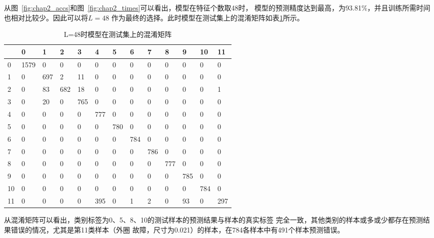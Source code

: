 从图~\ref{fig:chap2_accs}和图~\ref{fig:chap2_times}可以看出，模型在特征个数取48时，
模型的预测精度达到最高，为93.81\%，并且训练所需时间也相对比较少。因此可以将$L=48$
作为最终的选择。此时模型在测试集上的混淆矩阵如表\ref{tab:chap2:confusion_matrix}所示。
\begin{table}[htb]
  \centering
  \begin{minipage}[t]{0.9\linewidth} %
  \caption{L=48时模型在测试集上的混淆矩阵}
  \label{tab:chap2:confusion_matrix}
    \begin{tabularx}{\linewidth}{l|XXXXXXXXXXXX}
      \toprule[1.5pt]
         &    0 &   1 &   2 &   3 &   4 &   5 &   6 &   7 &   8 &   9 &  10 &  11 \\\midrule[1pt]
      0  & 1579 &   0 &   0 &   0 &   0 &   0 &   0 &   0 &   0 &   0 &   0 &   0 \\
      1  &    0 & 697 &   2 &  11 &   0 &   0 &   0 &   0 &   0 &   0 &   0 &   0 \\
      2  &    0 &  83 & 682 &  18 &   0 &   0 &   0 &   0 &   0 &   0 &   0 &   1 \\
      3  &    0 &  20 &   0 & 765 &   0 &   0 &   0 &   0 &   0 &   0 &   0 &   0 \\
      4  &    0 &   0 &   0 &   0 & 777 &   0 &   0 &   0 &   0 &   0 &   0 &   0 \\
      5  &    0 &   0 &   0 &   0 &   0 & 780 &   0 &   0 &   0 &   0 &   0 &   0 \\
      6  &    0 &   0 &   0 &   0 &   0 &   0 & 784 &   0 &   0 &   0 &   0 &   0 \\
      7  &    0 &   0 &   0 &   0 &   0 &   0 &   0 & 786 &   0 &   0 &   0 &   0 \\
      8  &    0 &   0 &   0 &   0 &   0 &   0 &   0 &   0 & 777 &   0 &   0 &   0 \\
      9  &    0 &   0 &   0 &   0 &   0 &   0 &   0 &   0 &   0 & 785 &   0 &   0 \\
      10 &    0 &   0 &   0 &   0 &   0 &   0 &   0 &   0 &   0 &   0 & 784 &   0 \\
      11 &    0 &   0 &   0 &   0 & 395 &   0 &   1 &   2 &   0 &  93 &   0 & 297 \\
      \bottomrule[1.5pt]
    \end{tabularx}
  \end{minipage}
\end{table}

从混淆矩阵可以看出，类别标签为0、5、8、10的测试样本的预测结果与样本的真实标签
完全一致，其他类别的样本或多或少都存在预测结果错误的情况，尤其是第11类样本（外圈
故障，尺寸为0.021）的样本，在784各样本中有491个样本预测错误。

